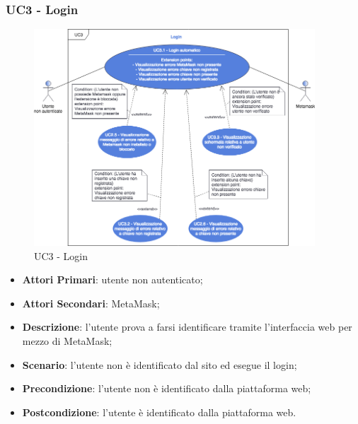 \subsubsection{UC3 - Login}
\begin{figure}[h]
	\includegraphics[width=10.5cm]{res/images/UC3Login.png} %
	\centering
	\caption{UC3 - Login}
	
\end{figure}
\begin{itemize}
	\item \textbf{Attori Primari}:
	utente non autenticato;
	\item \textbf{Attori Secondari}:
	MetaMask\glo;
	\item \textbf{Descrizione}:
	l'utente prova a farsi identificare tramite l'interfaccia web per mezzo di MetaMask\glo;
	\item \textbf{Scenario}:
	l'utente non è identificato dal sito ed esegue il login;
	\item \textbf{Precondizione}:
	l'utente non è identificato dalla piattaforma web;
	\item \textbf{Postcondizione}:
	l'utente è identificato dalla piattaforma web. 
\end{itemize}
